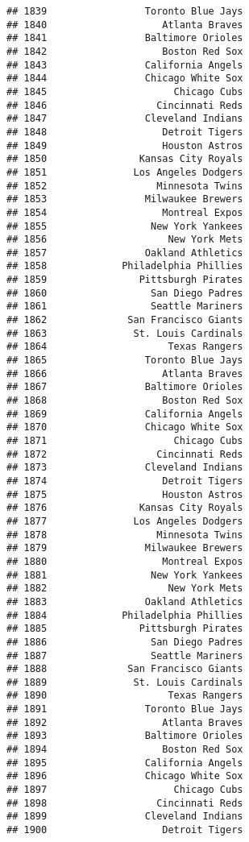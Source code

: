 \documentclass[]{article}
\begin{document}
\begin{verbatim}
## 1839                 Toronto Blue Jays
## 1840                    Atlanta Braves
## 1841                 Baltimore Orioles
## 1842                    Boston Red Sox
## 1843                 California Angels
## 1844                 Chicago White Sox
## 1845                      Chicago Cubs
## 1846                   Cincinnati Reds
## 1847                 Cleveland Indians
## 1848                    Detroit Tigers
## 1849                    Houston Astros
## 1850                Kansas City Royals
## 1851               Los Angeles Dodgers
## 1852                   Minnesota Twins
## 1853                 Milwaukee Brewers
## 1854                    Montreal Expos
## 1855                  New York Yankees
## 1856                     New York Mets
## 1857                 Oakland Athletics
## 1858             Philadelphia Phillies
## 1859                Pittsburgh Pirates
## 1860                  San Diego Padres
## 1861                  Seattle Mariners
## 1862              San Francisco Giants
## 1863               St. Louis Cardinals
## 1864                     Texas Rangers
## 1865                 Toronto Blue Jays
## 1866                    Atlanta Braves
## 1867                 Baltimore Orioles
## 1868                    Boston Red Sox
## 1869                 California Angels
## 1870                 Chicago White Sox
## 1871                      Chicago Cubs
## 1872                   Cincinnati Reds
## 1873                 Cleveland Indians
## 1874                    Detroit Tigers
## 1875                    Houston Astros
## 1876                Kansas City Royals
## 1877               Los Angeles Dodgers
## 1878                   Minnesota Twins
## 1879                 Milwaukee Brewers
## 1880                    Montreal Expos
## 1881                  New York Yankees
## 1882                     New York Mets
## 1883                 Oakland Athletics
## 1884             Philadelphia Phillies
## 1885                Pittsburgh Pirates
## 1886                  San Diego Padres
## 1887                  Seattle Mariners
## 1888              San Francisco Giants
## 1889               St. Louis Cardinals
## 1890                     Texas Rangers
## 1891                 Toronto Blue Jays
## 1892                    Atlanta Braves
## 1893                 Baltimore Orioles
## 1894                    Boston Red Sox
## 1895                 California Angels
## 1896                 Chicago White Sox
## 1897                      Chicago Cubs
## 1898                   Cincinnati Reds
## 1899                 Cleveland Indians
## 1900                    Detroit Tigers

\end{verbatim}
\end{document}
